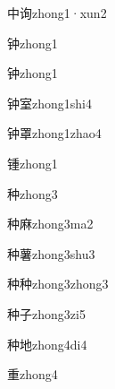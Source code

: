 \begin{verbete}[4;8]{中询}{zhong1·xun2}
\end{verbete}

\begin{verbete}[9]{钟}{zhong1}
\end{verbete}
\begin{verbete*}[9]{钟}{zhong1}
\end{verbete*}

\begin{verbete}[9;9]{钟室}{zhong1shi4}
\end{verbete}

\begin{verbete}[9;13]{钟罩}{zhong1zhao4}
\end{verbete}

\begin{verbete}[14]{锺}{zhong1}
\end{verbete}

\begin{verbete}[9]{种}{zhong3}
\end{verbete}

\begin{verbete}[9;11]{种麻}{zhong3ma2}
\end{verbete}

\begin{verbete}[9;16]{种薯}{zhong3shu3}
\end{verbete}

\begin{verbete}[9;9]{种种}{zhong3zhong3}
\end{verbete}

\begin{verbete}[9;3]{种子}{zhong3zi5}
\end{verbete}

\begin{verbete}[9;6]{种地}{zhong4di4}
\end{verbete}

\begin{verbete}[9]{重}{zhong4}
\end{verbete}

